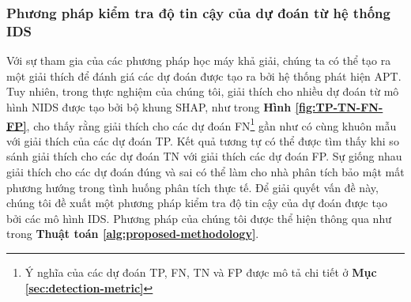 \subsubsection{Phương pháp kiểm tra độ tin cậy của dự đoán từ hệ thống IDS}
Với sự tham gia của các phương pháp học máy khả giải, chúng ta có thể tạo ra một giải thích để đánh giá các dự đoán được tạo ra bởi hệ thống phát hiện APT. Tuy nhiên, trong thực nghiệm của chúng tôi, giải thích cho nhiều dự đoán từ mô hình NIDS được tạo bởi bộ khung SHAP, như trong \textbf{Hình \ref{fig:TP-TN-FN-FP}}, cho thấy rằng giải thích cho các dự đoán FN\footnote{Ý nghĩa của các dự đoán TP, FN, TN và FP được mô tả chi tiết ở \textbf{Mục \ref{sec:detection-metric}}} gần như có cùng khuôn mẫu với giải thích của các dự đoán TP. Kết quả tương tự có thể được tìm thấy khi so sánh giải thích cho các dự đoán TN với giải thích các dự đoán FP. Sự giống nhau giải thích cho các dự đoán đúng và sai có thể làm cho nhà phân tích bảo mật mất phương hướng trong tình huống phân tích thực tế. Để giải quyết vấn đề này, chúng tôi đề xuất một phương pháp kiểm tra độ tin cậy của dự đoán được tạo bởi các mô hình IDS. Phương pháp của chúng tôi được thể hiện thông qua như trong \textbf{Thuật toán \ref{alg:proposed-methodology}}.

